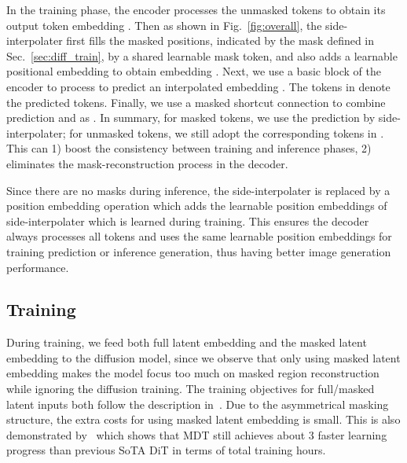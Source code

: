 \documentclass[final]{cvpr}
\begin{document}
In the training phase, the encoder processes the unmasked tokens to obtain its output token embedding .  
Then as shown in Fig.~\ref{fig:overall}, the side-interpolater first fills the masked positions,
indicated by the mask  defined in Sec.~\ref{sec:diff_train}, by a shared learnable mask token, 
and also adds a learnable positional embedding  to obtain embedding . 
Next, we use a basic block of the encoder to process  to predict an interpolated embedding . 
The tokens in  denote the predicted tokens. 
Finally,  we use a masked shortcut connection to combine prediction  and  as  .  
In summary, for masked tokens, we use the prediction by side-interpolater;  for unmasked tokens, we still adopt the corresponding tokens in . 
This can 
1) boost the consistency between training and inference phases, 
2) eliminates the mask-reconstruction process in the decoder.

Since there are no masks during inference, the side-interpolater is replaced by a position embedding operation which adds the learnable position embeddings  
of side-interpolater  which is learned during training. 
This ensures the decoder always processes all tokens  and uses the same learnable position embeddings for training prediction  or inference  generation,  
thus having better image generation performance. 

	
	
\subsection{Training}
During training, we feed both full latent embedding  and the masked latent embedding  to the diffusion model,
since we observe that only using masked latent embedding makes the model
focus too much on masked region reconstruction while ignoring the diffusion training.
The training objectives for full/masked latent inputs both follow the description in~.
Due to the asymmetrical masking structure, the extra costs for using masked latent embedding
is small.  This is also demonstrated by~ which shows that  MDT still achieves about  3 faster learning progress than previous SoTA DiT  in terms of total training hours. 
\end{document}
